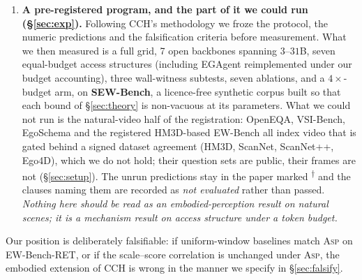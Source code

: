 \documentclass[10pt]{article}
\newcommand{\VnBackbones}{seven}
\providecommand{\VnBackbones}{--}
\renewcommand{\VnBackbones}{7}
\theoremstyle{definition}
\theoremstyle{plain}
\newcommand{\pred}{\textsuperscript{\textcolor{cpred}{$\dagger$}}}
\newcommand{\ASP}{\textsc{Asp}}
\begin{document}
\begin{enumerate}[leftmargin=1.6em,itemsep=1pt]
\item \textbf{A pre-registered program, and the part of it we could run (\S\ref{sec:exp}).} Following CCH's methodology we froze the protocol, the numeric predictions and the falsification criteria before measurement. What we then measured is a full grid, \VnBackbones{} open backbones spanning $3$--$31$B, seven equal-budget access structures (including EGAgent \citep{egagent} reimplemented under our budget accounting), three wall-witness subtests, seven ablations, and a $4\times$-budget arm, on \textbf{SEW-Bench}, a licence-free synthetic corpus built so that each bound of \S\ref{sec:theory} is non-vacuous at its parameters. What we could not run is the natural-video half of the registration: OpenEQA, VSI-Bench, EgoSchema and the registered HM3D-based EW-Bench all index video that is gated behind a signed dataset agreement (HM3D, ScanNet, ScanNet++, Ego4D), which we do not hold; their question sets are public, their frames are not (\S\ref{sec:setup}). The unrun predictions stay in the paper marked \pred{} and the clauses naming them are recorded as \emph{not evaluated} rather than passed. \emph{Nothing here should be read as an embodied-perception result on natural scenes; it is a mechanism result on access structure under a token budget.}
\end{enumerate}

Our position is deliberately falsifiable: if uniform-window baselines match \ASP{} on EW-Bench-RET, or if the scale--score correlation is unchanged under \ASP{}, the embodied extension of CCH is wrong in the manner we specify in \S\ref{sec:falsify}.
\end{document}
